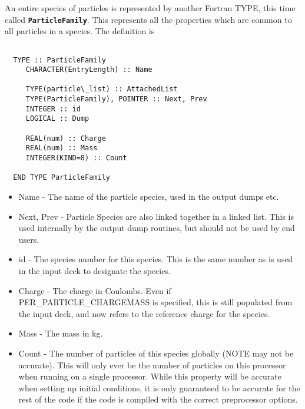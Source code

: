 \documentclass[12pt,a4paper]{article}
\newcommand{\simpleboxverbatim}{\begin{Verbatim}[obeytabs=true,frame=single,
  framerule=0.5mm,rulecolor=\color{warwickmid},formatcom=\color{black}]}
\newcommand{\inlinecode}[1]{{\color{warwickred} \bf\texttt{#1}}}
\begin{document}
An entire species of particles is represented by another Fortran TYPE, this
time called \inlinecode{ParticleFamily}. This represents all the properties
which are common to all particles in a species. The definition is

\simpleboxverbatim

  TYPE :: ParticleFamily
     CHARACTER(EntryLength) :: Name

     TYPE(particle\_list) :: AttachedList
     TYPE(ParticleFamily), POINTER :: Next, Prev
     INTEGER :: id
     LOGICAL :: Dump

     REAL(num) :: Charge
     REAL(num) :: Mass
     INTEGER(KIND=8) :: Count

  END TYPE ParticleFamily

\end{Verbatim}

\begin{itemize}
\item Name - The name of the particle species, used in the output dumps etc.
\item Next, Prev - Particle Species are also linked together in a linked
  list. This is used internally by the output dump routines, but should not be
  used by end users.
\item id - The species number for this species. This is the same number as is
  used in the input deck to designate the species.
\item Charge - The charge in Coulombs. Even if PER\_PARTICLE\_CHARGEMASS is
  specified, this is still populated from the input deck, and now refers to
  the reference charge for the species.
\item Mass - The mass in kg.
\item Count - The number of particles of this species globally (NOTE may not
  be accurate). This will only ever be the number of particles on this
  processor when running on a single processor. While this property will be
  accurate when setting up initial conditions, it is only guaranteed to be
  accurate for the rest of the code if the code is compiled with the correct
  preprocessor options.
\end{itemize}
\end{document}
